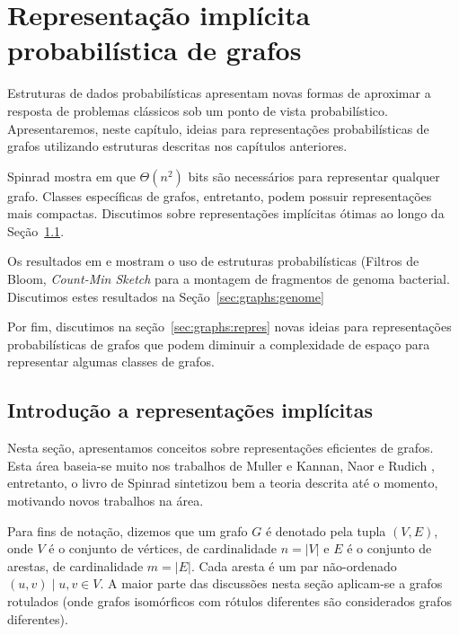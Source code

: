 \section{Representação implícita probabilística de grafos}\label{sec:graphs}

Estruturas de dados probabilísticas apresentam novas formas de aproximar a resposta de problemas clássicos sob um ponto de vista probabilístico. Apresentaremos, neste capítulo, ideias para representações probabilísticas de grafos utilizando estruturas descritas nos capítulos anteriores.

Spinrad mostra em \cite{spinrad2003efficient} que $\Theta(n^2)$ bits são necessários para representar qualquer grafo. Classes específicas de grafos, entretanto, podem possuir representações mais compactas. Discutimos sobre representações implícitas ótimas ao longo da Seção~\ref{sec:graphs:implicit}.

Os resultados em \cite{pell2012scaling} e \cite{zhang2014these} mostram o uso de estruturas probabilísticas (Filtros de Bloom, \emph{Count-Min Sketch} para a montagem de fragmentos de genoma bacterial. Discutimos estes resultados na Seção~\ref{sec:graphs:genome}

Por fim, discutimos na seção~\ref{sec:graphs:repres} novas ideias para representações probabilísticas de grafos que podem diminuir a complexidade de espaço para representar algumas classes de grafos.

\subsection{Introdução a representações implícitas}\label{sec:graphs:implicit}

Nesta seção, apresentamos conceitos sobre representações eficientes de grafos. Esta área baseia-se muito nos trabalhos de Muller \cite{muller1988local} e Kannan, Naor e Rudich \cite{kannan1992implicat}, entretanto, o livro de Spinrad \cite{spinrad2003efficient} sintetizou bem a teoria descrita até o momento, motivando novos trabalhos na área.

Para fins de notação, dizemos que um grafo $G$ é denotado pela tupla $(V, E)$, onde $V$ é o conjunto de vértices, de cardinalidade $n = |V|$ e $E$ é o conjunto de arestas, de cardinalidade $m = |E|$. Cada aresta é um par não-ordenado $(u, v) \mid u,v \in V$. A maior parte das discussões nesta seção aplicam-se a grafos rotulados (onde grafos isomórficos com rótulos diferentes são considerados grafos diferentes).

